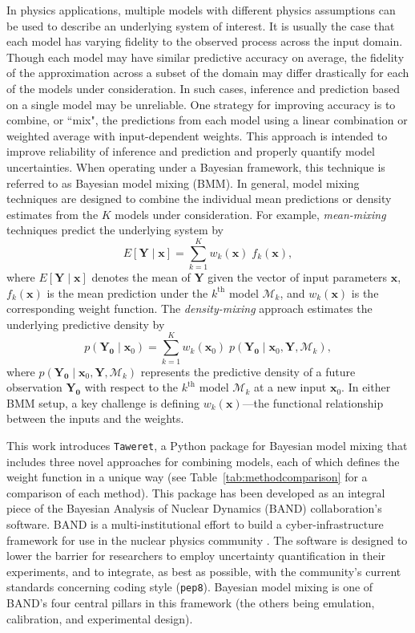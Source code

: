 \documentclass[10pt, preprint,aps,prc,floatfix,
tightenlines,
nofootinbib,superscriptaddress]{revtex4-2}
\newcommand{\M}{\mathcal{M}}
\newcommand{\xvec}{\boldsymbol x}
\begin{document}
In physics applications, multiple models with different physics assumptions can be used to describe an underlying system of interest. It is usually the case that each model has varying fidelity to the observed process across the input domain. Though each model may have similar predictive accuracy on average, the fidelity of the approximation across a subset of the domain may differ drastically for each of the models under consideration. In such cases, inference and prediction based on a single model may be unreliable. One strategy for improving accuracy is to combine, or  ``mix", the predictions from each model using a linear combination or weighted average with input-dependent weights. This approach is intended to improve reliability of inference and prediction and properly quantify model uncertainties. When operating under a Bayesian framework, this technique is referred to as Bayesian model mixing (BMM). In general, model mixing techniques are designed to combine the individual mean predictions or density estimates from the $K$ models under consideration.
For example, \textit{mean-mixing} techniques predict the underlying system by 
\begin{equation}
    E[\bm Y \mid \xvec] = \sum_{k = 1}^K w_k(\xvec)\; f_k(\xvec),
\end{equation}
where $E[\bm Y\mid\xvec]$ denotes the mean of $\bm Y$ given the vector of input parameters $\bm x$, $f_k(\xvec)$ is the mean prediction under the $k^\mathrm{th}$ model $\mathcal{M}_k$, and $w_k(\xvec)$ is the corresponding weight function. The \textit{density-mixing} approach estimates the underlying predictive density by
\begin{equation}
    p(\bm{Y_{0}} \mid \xvec_{0}) = \sum_{k = 1}^K w_k(\xvec_{0})\;p(\bm{Y_{0}} \mid \xvec_{0}, \bm{Y}, \M_k),
\end{equation}
where $p(\bm{Y_{0}} \mid \xvec_{0}, \bm{Y}, \M_k)$ represents the predictive density of a future observation $\bm{Y_{0}}$ with respect to the $k^\mathrm{th}$ model $\mathcal{M}_k$ at a new input $\xvec_{0}$. In either BMM setup, a key challenge is defining $w_k(\xvec)$---the functional relationship between the inputs and the weights. 

This work introduces \texttt{Taweret}, a Python package for Bayesian model mixing that includes three novel approaches for combining models, each of which defines the weight function in a unique way (see Table~\ref{tab:methodcomparison} for a comparison of each method). This package has been developed as an integral piece of the Bayesian Analysis of Nuclear Dynamics (BAND) collaboration's software. BAND is a multi-institutional effort to build a cyber-infrastructure framework for use in the nuclear physics community \cite{Phillips:2020dmw, bandframework}. The software is designed to lower the barrier for researchers to employ uncertainty quantification in their experiments, and to integrate, as best as possible, with the community's current standards concerning coding style (\texttt{pep8}). Bayesian model mixing is one of BAND's four central pillars in this framework (the others being emulation, calibration, and experimental design).
\end{document}
